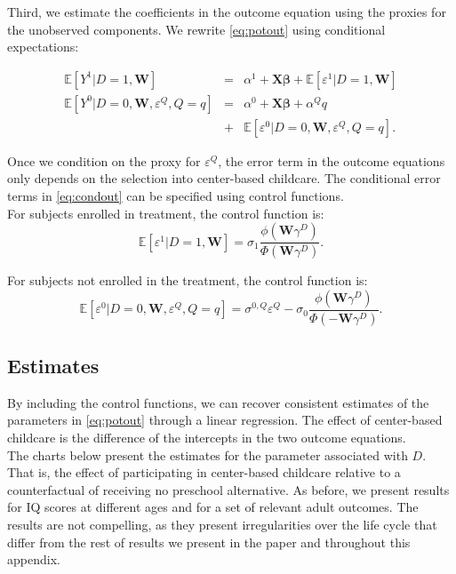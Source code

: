 \noindent Third, we estimate the coefficients in the outcome equation using the proxies for the unobserved components. We rewrite \eqref{eq:potout} using conditional expectations:

\begin{eqnarray}
\mathbb{E}\left[Y^1|D=1,\mathbf{W}\right]                         &=& \alpha^1+\mathbf{X}\bm{\beta}              +\mathbb{E}\left[\varepsilon^1|D=1,\mathbf{W}      \right] \nonumber \\
\mathbb{E}\left[Y^0|D=0,\mathbf{W},\varepsilon^{Q},Q=q\right] &=& \alpha^0+\mathbf{X}\bm{\beta} +\alpha^Q q \label{eq:condout} \\ \nonumber &+& \mathbb{E}\left[\varepsilon^0|D=0,\mathbf{W},\varepsilon^{Q},Q=q\right].
\end{eqnarray}

\noindent Once we condition on the proxy for $\varepsilon^{Q}$, the error term in the outcome equations only depends on the selection into center-based childcare. The conditional error terms in \eqref{eq:condout} can be specified using control functions.\\

\noindent For subjects enrolled in treatment, the control function is:
\begin{equation}
\mathbb{E} \left[\varepsilon^1|D=1,\mathbf{W} \right]=\sigma_1\frac{\phi \left( \mathbf{W} \gamma^D \right) }{ \Phi \left( \mathbf{W} \gamma^D \right) }. \label{eq:contam}
\end{equation}

\noindent For subjects not enrolled in the treatment, the control function is:
\begin{equation}
\mathbb{E} \left[\varepsilon^0|D=0,\mathbf{W},\varepsilon^{Q},Q=q\right]= \sigma^{0,Q}\varepsilon^{Q} - \sigma_0 \frac{\phi\left(\mathbf{W}\gamma^D\right)}{\Phi\left( - \mathbf{W} \gamma^D \right) }. \label{eq:home}
\end{equation}

\subsection{Estimates}

\noindent By including the control functions, we can recover consistent estimates of the parameters in \eqref{eq:potout} through a linear regression. The effect of center-based childcare is the difference of the intercepts in the two outcome equations.\\

\noindent The charts below present the estimates for the parameter associated with $D$. That is, the effect of participating in center-based childcare relative to a counterfactual of receiving no preschool alternative. As before, we present results for IQ scores at different ages and for a set of relevant adult outcomes. The results are not compelling, as they present irregularities over the life cycle that differ from the rest of results we present in the paper and throughout this appendix.

